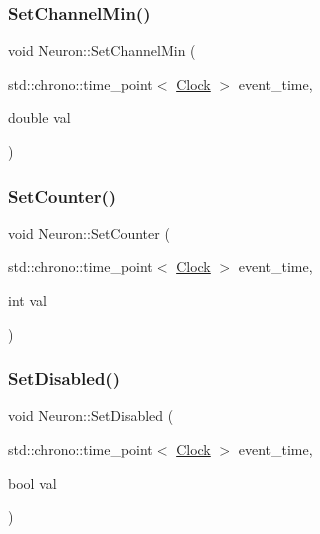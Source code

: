 \mbox{\label{classNeuron_ae463ad8173c63e7970a5f4594667d481}} 
\subsubsection{\texorpdfstring{Set\+Channel\+Min()}{SetChannelMin()}}
{\footnotesize\ttfamily void Neuron\+::\+Set\+Channel\+Min (\begin{DoxyParamCaption}\item[{std\+::chrono\+::time\+\_\+point$<$ \mbox{\hyperlink{universe_8h_a0ef8d951d1ca5ab3cfaf7ab4c7a6fd80}{Clock}} $>$}]{event\+\_\+time,  }\item[{double}]{val }\end{DoxyParamCaption})\hspace{0.3cm}{\ttfamily [inline]}}

\mbox{\label{classNeuron_a92f942f6f0bd783c39bb550cf4bb8fd0}} 
\subsubsection{\texorpdfstring{Set\+Counter()}{SetCounter()}}
{\footnotesize\ttfamily void Neuron\+::\+Set\+Counter (\begin{DoxyParamCaption}\item[{std\+::chrono\+::time\+\_\+point$<$ \mbox{\hyperlink{universe_8h_a0ef8d951d1ca5ab3cfaf7ab4c7a6fd80}{Clock}} $>$}]{event\+\_\+time,  }\item[{int}]{val }\end{DoxyParamCaption})\hspace{0.3cm}{\ttfamily [inline]}}

\mbox{\label{classNeuron_af9ad96e27f7692e9e328d90e4c96977a}} 
\subsubsection{\texorpdfstring{Set\+Disabled()}{SetDisabled()}}
{\footnotesize\ttfamily void Neuron\+::\+Set\+Disabled (\begin{DoxyParamCaption}\item[{std\+::chrono\+::time\+\_\+point$<$ \mbox{\hyperlink{universe_8h_a0ef8d951d1ca5ab3cfaf7ab4c7a6fd80}{Clock}} $>$}]{event\+\_\+time,  }\item[{bool}]{val }\end{DoxyParamCaption})\hspace{0.3cm}{\ttfamily [inline]}}

